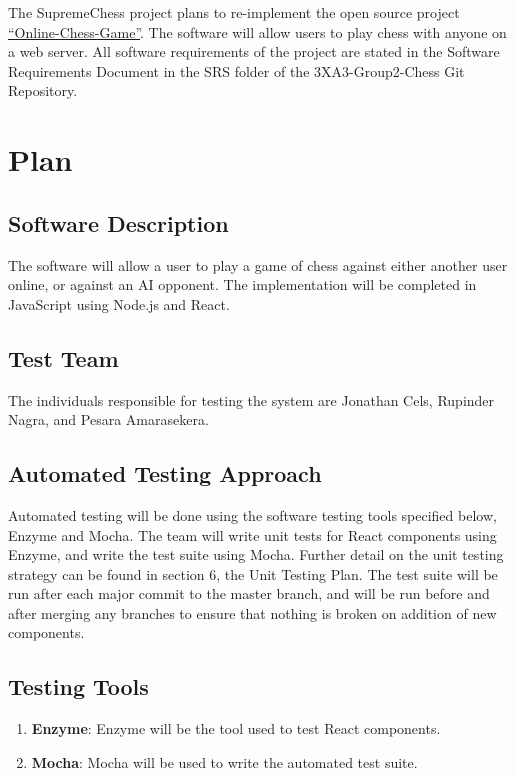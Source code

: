 \documentclass[12pt, titlepage]{article}
\begin{document}
The SupremeChess project plans to re-implement the open source project \href{https://github.com/techwithtim/Online-Chess-Game}{``Online-Chess-Game''}. The software will allow users to play chess with anyone on a web server. All software requirements of the project are stated in the Software Requirements Document in the SRS folder of the 3XA3-Group2-Chess Git Repository.

\section{Plan}
	
\subsection{Software Description}

The software will allow a user to play a game of chess against either another user online, or against an AI opponent. The implementation will be completed in JavaScript using Node.js and React.

\subsection{Test Team}

The individuals responsible for testing the system are Jonathan Cels, Rupinder Nagra, and Pesara Amarasekera.

\subsection{Automated Testing Approach}

Automated testing will be done using the software testing tools specified below, Enzyme and Mocha. The team will write unit tests for React components using Enzyme, and write the test suite using Mocha. Further detail on the unit testing strategy can be found in section 6, the Unit Testing Plan. The test suite will be run after each major commit to the master branch, and will be run before and after merging any branches to ensure that nothing is broken on addition of new components.

\subsection{Testing Tools}
\begin{enumerate}
    \item \textbf{Enzyme}:
        Enzyme will be the tool used to test React components.
    \item \textbf{Mocha}:
        Mocha will be used to write the automated test suite.
\end{enumerate}
\end{document}
